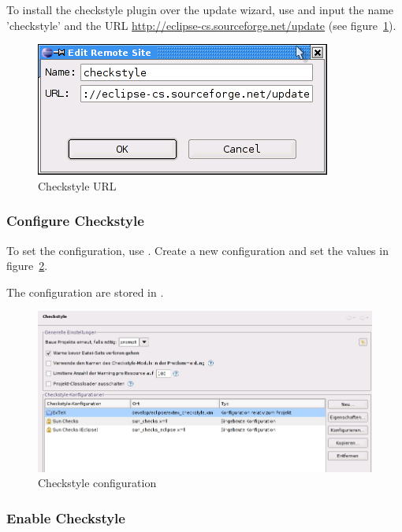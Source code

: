 To install the checkstyle plugin over the update wizard, use
 and input the name
'checkstyle' and the URL \url{http://eclipse-cs.sourceforge.net/update}
(see figure~\ref{fig:eclipse-checkstyle-url}).
\begin{figure}[htp]
  \centering  \includegraphics[scale=.5]{image/eclipse-checkstyle-url}
  \caption{Checkstyle URL}\label{fig:eclipse-checkstyle-url}
\end{figure}

\subsubsection*{Configure Checkstyle}

To set the configuration, use .
Create a new configuration and set the values in
figure~\ref{fig:eclipse-checkstyle-config}.

The configuration are stored in .

\begin{figure}[htp]
  \centering  \includegraphics[scale=.5]{image/eclipse-checkstyle-config}
  \caption{Checkstyle configuration}\label{fig:eclipse-checkstyle-config}
\end{figure}

\subsubsection*{Enable Checkstyle}

